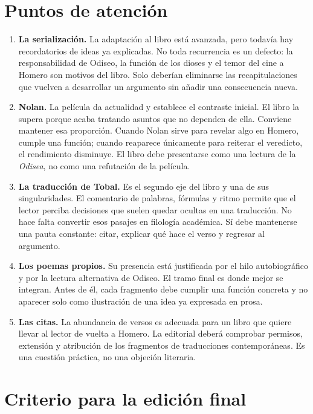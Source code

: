 \documentclass[12pt,a4paper]{article}
\begin{document}
\section*{Puntos de atención}

\begin{enumerate}
  \item \textbf{La serialización.} La adaptación al libro está avanzada, pero todavía hay recordatorios de ideas ya explicadas. No toda recurrencia es un defecto: la responsabilidad de Odiseo, la función de los dioses y el temor del cine a Homero son motivos del libro. Solo deberían eliminarse las recapitulaciones que vuelven a desarrollar un argumento sin añadir una consecuencia nueva.

  \item \textbf{Nolan.} La película da actualidad y establece el contraste inicial. El libro la supera porque acaba tratando asuntos que no dependen de ella. Conviene mantener esa proporción. Cuando Nolan sirve para revelar algo en Homero, cumple una función; cuando reaparece únicamente para reiterar el veredicto, el rendimiento disminuye. El libro debe presentarse como una lectura de la \emph{Odisea}, no como una refutación de la película.

  \item \textbf{La traducción de Tobal.} Es el segundo eje del libro y una de sus singularidades. El comentario de palabras, fórmulas y ritmo permite que el lector perciba decisiones que suelen quedar ocultas en una traducción. No hace falta convertir esos pasajes en filología académica. Sí debe mantenerse una pauta constante: citar, explicar qué hace el verso y regresar al argumento.

  \item \textbf{Los poemas propios.} Su presencia está justificada por el hilo autobiográfico y por la lectura alternativa de Odiseo. El tramo final es donde mejor se integran. Antes de él, cada fragmento debe cumplir una función concreta y no aparecer solo como ilustración de una idea ya expresada en prosa.

  \item \textbf{Las citas.} La abundancia de versos es adecuada para un libro que quiere llevar al lector de vuelta a Homero. La editorial deberá comprobar permisos, extensión y atribución de los fragmentos de traducciones contemporáneas. Es una cuestión práctica, no una objeción literaria.
\end{enumerate}

\section*{Criterio para la edición final}
\end{document}
